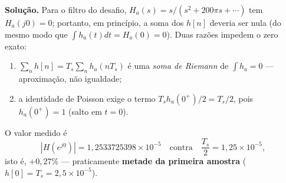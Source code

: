 \textbf{Solução.} Para o filtro do desafio, $H_a(s)=s/(s^2+200\pi s+\cdots)$
tem $H_a(j0)=0$; portanto, em princípio, a soma dos $h[n]$ deveria ser nula
(do mesmo modo que $\int h_a(t)dt=H_a(0)=0$). Duas razões impedem o zero
exato:
\begin{enumerate}
  \item $\sum_n h[n]=T_s\sum_n h_a(nT_s)$ é uma \emph{soma de Riemann} de
        $\int h_a=0$ — aproximação, não igualdade;
  \item a identidade de Poisson exige o termo
        $T_sh_a(0^+)/2=T_s/2$, pois $h_a(0^+)=1$ (salto em $t=0$).
\end{enumerate}
O valor medido é
\[
  \left|H(e^{j0})\right|=1{,}2533725398\times10^{-5}
  \quad\text{contra}\quad \frac{T_s}{2}=1{,}25\times10^{-5},
\]
isto é, $+0{,}27\%$ — praticamente \textbf{metade da primeira amostra}
($h[0]=T_s=2{,}5\times10^{-5}$).

